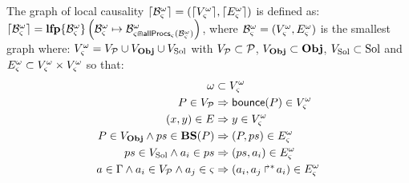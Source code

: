\newcommand{\V}{V}
\newcommand{\E}{E}
\newcommand{\cwV}{\V_\ctx^\w}
\newcommand{\cwE}{\E_\ctx^\w}
\newcommand{\VProc}{\V_\PHproc}
\newcommand{\VObj}{\V_\Obj}
\newcommand{\VSol}{\V_{\Sol}}

\def\Bv{\sat{\cwV}}
\def\Be{\sat{\cwE}}
\def\BvProc{\textcolor{red}{\sat{\cwV}^\PHproc}}
\def\BvObj{\textcolor{red}{\sat{\cwV}^\Obj}}
\def\BvSol{\textcolor{red}{\sat{\cwV}^{\Sol}}}

\newcommand{\Bee}[2]{\Be^{#1}_{#2}}

\begin{definition}
  The graph of local causality $\cwB = (\Bv, \Be)$ is defined as: $\lceil \mathcal{B}_\varsigma^\omega\rceil = \mathbf{lfp}\{\mathcal{B}^\omega_\varsigma\}\left(\mathcal{B}^\omega_\varsigma\mapsto\mathcal{B}^\omega_{\varsigma \Cap \mathsf{allProcs}_\varsigma(\mathcal{B}^\omega_\varsigma)}\right)$,
  where $\myB = (\cwV, \cwE)$ is the smallest graph where: $\cwV = \VProc \cup \VObj \cup \VSol$ with $\VProc \subset \PHproc$, $\VObj \subset \Obj$, $\VSol \subset \Sol$ and $\cwE \subset \cwV \times \cwV$ so that:
  \begin{align}
    \w &\subset \cwV \label{eq:Vw} \\
    P \in \VProc &\Rightarrow \PHbounce(P) \in \cwV \label{eq:Vproc} \\
    (x, y) \in \E &\Rightarrow y \in \cwV \label{eq:VE} \\
    P \in \VObj \wedge ps \in \BS(P) &\Rightarrow (P, ps) \in \cwE \label{eq:ESol1} \\
    ps \in \VSol \wedge a_i \in ps &\Rightarrow (ps, a_i) \in \cwE \label{eq:ESol2} \\
    a \in \components \wedge a_i \in \VProc \wedge a_j \in \ctx &\Rightarrow (a_i, \PHobjp{a}{j}{i}) \in \cwE \label{eq:EReq} \\

\end{align}
\end{definition}

